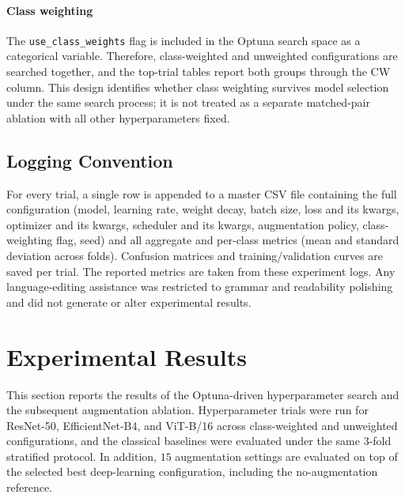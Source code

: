 \documentclass[conference]{IEEEtran}
\begin{document}
\paragraph{Class weighting}
The \texttt{use\_class\_weights} flag is included in the Optuna search space as a categorical variable. Therefore, class-weighted and unweighted configurations are searched together, and the top-trial tables report both groups through the CW column. This design identifies whether class weighting survives model selection under the same search process; it is not treated as a separate matched-pair ablation with all other hyperparameters fixed.

\subsection{Logging Convention}
For every trial, a single row is appended to a master CSV file containing the full configuration (model, learning rate, weight decay, batch size, loss and its kwargs, optimizer and its kwargs, scheduler and its kwargs, augmentation policy, class-weighting flag, seed) and all aggregate and per-class metrics (mean and standard deviation across folds). Confusion matrices and training/validation curves are saved per trial. The reported metrics are taken from these experiment logs. Any language-editing assistance was restricted to grammar and readability polishing and did not generate or alter experimental results.

\section{Experimental Results}
\label{sec:results}

This section reports the results of the Optuna-driven hyperparameter search and the subsequent augmentation ablation. Hyperparameter trials were run for ResNet-50, EfficientNet-B4, and ViT-B/16 across class-weighted and unweighted configurations, and the classical baselines were evaluated under the same 3-fold stratified protocol. In addition, $15$ augmentation settings are evaluated on top of the selected best deep-learning configuration, including the no-augmentation reference.
\end{document}

